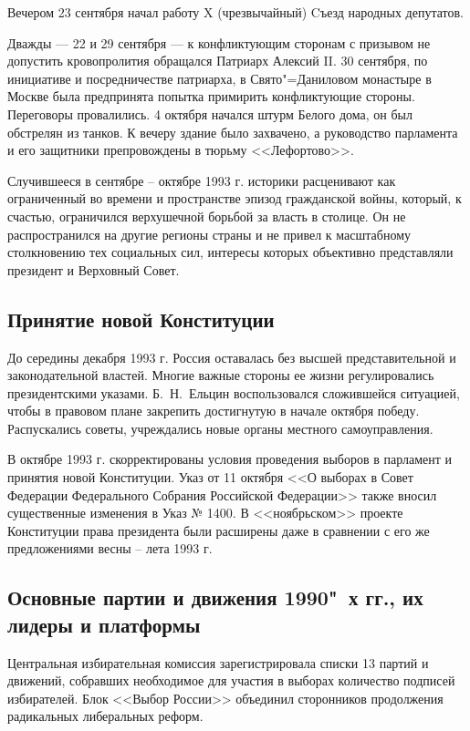 Вечером 23 сентября начал работу X (чрезвычайный) Cъезд народных депутатов.

Дважды --- 22 и 29 сентября --- к конфликтующим сторонам с призывом не допустить кровопролития обращался Патриарх Алексий II. 30 сентября, по инициативе и посредничестве патриарха, в Свято"=Даниловом монастыре в Москве была предпринята попытка примирить конфликтующие стороны. Переговоры провалились. 4 октября начался штурм Белого дома, он был обстрелян из танков. К вечеру здание было захвачено, а руководство парламента и его защитники препровождены в тюрьму <<Лефортово>>.

Случившееся в сентябре -- октябре 1993 г. историки расценивают как ограниченный во времени и пространстве эпизод гражданской войны, который, к счастью, ограничился верхушечной борьбой за власть в столице. Он не распространился на другие регионы страны и не привел к масштабному столкновению тех социальных сил, интересы которых объективно представляли президент и Верховный Совет.

\subsection{Принятие новой Конституции}

До середины декабря 1993 г. Россия оставалась без высшей представительной и законодательной властей. Многие важные стороны ее жизни регулировались президентскими указами. Б.~Н.~Ельцин воспользовался сложившейся ситуацией, чтобы в правовом плане закрепить достигнутую в начале октября победу. Распускались советы, учреждались новые органы местного самоуправления.

В октябре 1993 г. скорректированы условия проведения выборов в парламент и принятия новой Конституции. Указ от 11 октября <<О выборах в Совет Федерации Федерального Собрания Российской Федерации>> также вносил существенные изменения в Указ № 1400. В <<ноябрьском>> проекте Конституции права президента были расширены даже в сравнении с его же предложениями весны -- лета 1993 г.

\subsection{Основные партии и движения 1990"~х гг., их лидеры и платформы}

Центральная избирательная комиссия зарегистрировала списки 13 партий и движений, собравших необходимое для участия в выборах количество подписей избирателей. Блок <<Выбор России>> объединил сторонников продолжения радикальных либеральных реформ.

